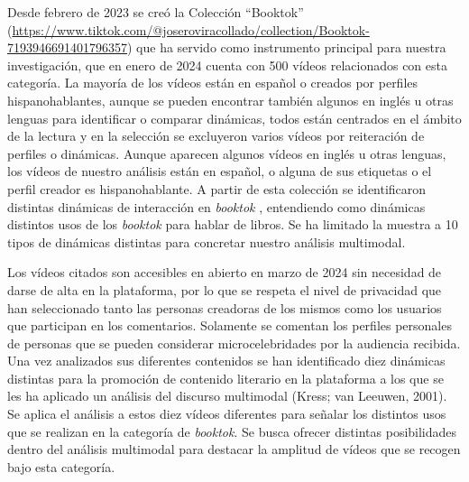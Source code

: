Desde febrero de 2023 se creó la Colección ``Booktok''
(\url{https://www.tiktok.com/@joseroviracollado/collection/Booktok-7193946691401796357})
que ha servido como instrumento principal para nuestra investigación,
que en enero de 2024 cuenta con 500 vídeos relacionados con esta
categoría. La mayoría de los vídeos están en español o creados por
perfiles hispanohablantes, aunque se pueden encontrar también algunos en
inglés u otras lenguas para identificar o comparar dinámicas, todos
están centrados en el ámbito de la lectura y en la selección se
excluyeron varios vídeos por reiteración de perfiles o dinámicas. Aunque
aparecen algunos vídeos en inglés u otras lenguas, los vídeos de nuestro
análisis están en español, o alguna de sus etiquetas o el perfil creador
es hispanohablante. A partir de esta colección se identificaron
distintas dinámicas de interacción en \emph{booktok} \cite{roviracollado2022}, entendiendo como dinámicas distintos usos de los
\emph{booktok} para hablar de libros. Se ha limitado la muestra a 10
tipos de dinámicas distintas para concretar nuestro análisis multimodal.

Los vídeos citados son accesibles en abierto en marzo de 2024 sin
necesidad de darse de alta en la plataforma, por lo que se respeta el
nivel de privacidad que han seleccionado tanto las personas creadoras de
los mismos como los usuarios que participan en los comentarios.
Solamente se comentan los perfiles personales de personas que se pueden
considerar microcelebridades por la audiencia recibida. Una vez
analizados sus diferentes contenidos se han identificado diez dinámicas
distintas  para la promoción de contenido literario en la
plataforma a los que se les ha aplicado un análisis del discurso
multimodal (Kress; van Leeuwen, 2001). Se aplica el análisis a estos
diez vídeos diferentes para señalar los distintos usos que se realizan
en la categoría de \emph{booktok}. Se busca ofrecer distintas
posibilidades dentro del análisis multimodal para destacar la amplitud
de vídeos que se recogen bajo esta categoría.


